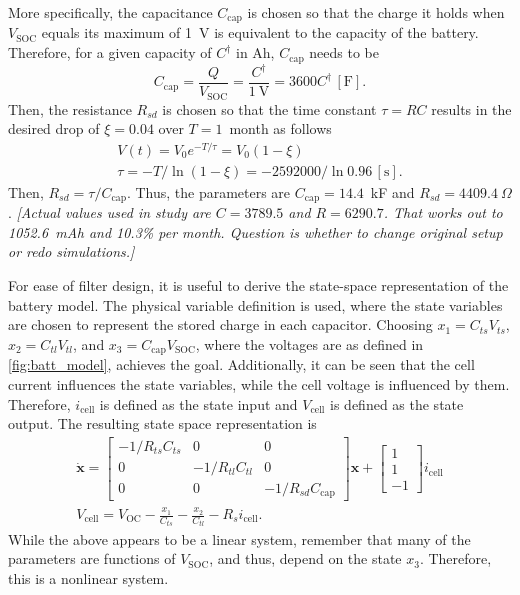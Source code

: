 \documentclass[../zhang_thesis.tex]{subfiles}
\begin{document}
More specifically, the capacitance $C_\text{cap}$ is chosen so that the charge it holds when $V_\text{SOC}$ equals its maximum of 1~V is equivalent to the capacity of the battery. Therefore, for a given capacity of $C^\dag$ in Ah, $C_\text{cap}$ needs to be
\begin{equation}
    C_\text{cap} = \frac{Q}{V_\text{SOC}} = \frac{C^\dag}{1~\text{V}} = 3600 C^\dag \,[\text{F}].
\end{equation}
Then, the resistance $R_{sd}$ is chosen so that the time constant $\tau=RC$ results in the desired drop of $\xi=0.04$ over $T=1$~month as follows
\begin{gather}
    V(t) = V_0 e^{-T/\tau} = V_0 (1-\xi) \\
    \tau = -T/\ln(1-\xi) = -2592000/\ln 0.96 \,[\text{s}].
\end{gather}
Then, $R_{sd}=\tau/C_\text{cap}$. Thus, the parameters are $C_\text{cap}=14.4$~kF and $R_{sd}=4409.4~\Omega$. \emph{[Actual values used in study are $C=3789.5$ and $R=6290.7$. That works out to 1052.6~mAh and 10.3\% per month. Question is whether to change original setup or redo simulations.]}

For ease of filter design, it is useful to derive the state-space representation of the battery model. The physical variable definition is used, where the state variables are chosen to represent the stored charge in each capacitor. Choosing $x_1=C_{ts}V_{ts}$, $x_2=C_{tl}V_{tl}$, and $x_3=C_\text{cap}V_\text{SOC}$, where the voltages are as defined in \autoref{fig:batt_model}, achieves the goal. Additionally, it can be seen that the cell current influences the state variables, while the
cell voltage is influenced by them. Therefore, $i_\text{cell}$ is defined as the state input and $V_\text{cell}$ is defined as the state output. The resulting state space representation is
\begin{gather}
    \dot{\mathbf{x}} = \begin{bmatrix}
        -1/R_{ts}C_{ts} & 0 & 0 \\
        0 & -1/R_{tl}C_{tl} & 0 \\
        0 & 0 & -1/R_{sd}C_\text{cap}
    \end{bmatrix} \mathbf{x} + \begin{bmatrix} 1 \\ 1 \\ -1 \end{bmatrix} i_\text{cell} \\
    V_\text{cell} = V_\text{OC} - \frac{x_1}{C_{ts}} - \frac{x_2}{C_{tl}} - R_s i_\text{cell}.
\end{gather}
While the above appears to be a linear system, remember that many of the parameters are functions of $V_\text{SOC}$, and thus, depend on the state $x_3$. Therefore, this is a nonlinear system.
\end{document}
